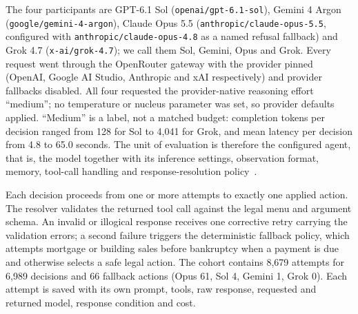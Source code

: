 The four participants are GPT-6.1 Sol (\texttt{openai/gpt-6.1-sol}), Gemini 4 Argon (\texttt{google/gemini-4-argon}), Claude Opus 5.5 (\texttt{anthropic/claude-opus-5.5}, configured with \texttt{anthropic/claude-opus-4.8} as a named refusal fallback) and Grok 4.7 (\texttt{x-ai/grok-4.7}); we call them Sol, Gemini, Opus and Grok. Every request went through the OpenRouter gateway with the provider pinned (OpenAI, Google AI Studio, Anthropic and xAI respectively) and provider fallbacks disabled. All four requested the provider-native reasoning effort ``medium''; no temperature or nucleus parameter was set, so provider defaults applied. ``Medium'' is a label, not a matched budget: completion tokens per decision ranged from 128 for Sol to 4,041 for Grok, and mean latency per decision from 4.8 to 65.0 seconds. The unit of evaluation is therefore the configured agent, that is, the model together with its inference settings, observation format, memory, tool-call handling and response-resolution policy~\cite{kapoor2026hal,zhang2026dece}.

Each decision proceeds from one or more attempts to exactly one applied action. The resolver validates the returned tool call against the legal menu and argument schema. An invalid or illogical response receives one corrective retry carrying the validation errors; a second failure triggers the deterministic fallback policy, which attempts mortgage or building sales before bankruptcy when a payment is due and otherwise selects a safe legal action. The cohort contains 8,679 attempts for 6,989 decisions and 66 fallback actions (Opus 61, Sol 4, Gemini 1, Grok 0). Each attempt is saved with its own prompt, tools, raw response, requested and returned model, response condition and cost.

